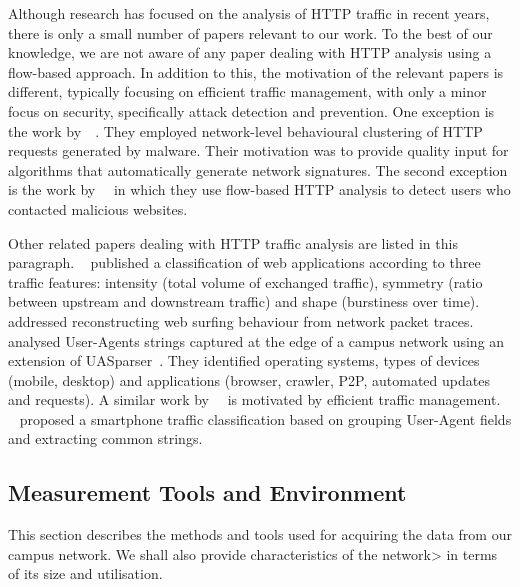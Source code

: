 Although research has focused on the analysis of HTTP traffic in recent years, there is only a small number of papers relevant to our work. To the best of our knowledge, we are not aware of any paper dealing with HTTP analysis using a flow-based approach. In addition to this, the motivation of the relevant papers is different, typically focusing on efficient traffic management, with only a minor focus on security, specifically attack detection and prevention. One exception is the work by~\citeauthor{Perdisci-2010-Behavioral}~\cite{Perdisci-2010-Behavioral}. They employed network-level behavioural clustering of HTTP requests generated by malware. Their motivation was to provide quality input for algorithms that automatically generate network signatures. The second exception is the work by~\citeauthor{Husak-2014-PhiGARo}~\cite{Husak-2014-PhiGARo} in which they use flow-based HTTP analysis to detect users who contacted malicious websites.

Other related papers dealing with HTTP traffic analysis are listed in this paragraph. \citeauthor{Augustin-2011-Traffic}~\cite{Augustin-2011-Traffic} published a classification of web applications according to three traffic features: intensity (total volume of exchanged traffic), symmetry (ratio between upstream and downstream traffic) and shape (burstiness over time). \citeauthor{Xie-2013-ReSurf}~\cite{Xie-2013-ReSurf} addressed reconstructing web surfing behaviour from network packet traces. \citeauthor{Xu-2014-Toward}~\cite{Xu-2014-Toward} analysed User-Agents strings captured at the edge of a campus network using an extension of UASparser~\cite{Mallat-2017-UASparser}. They identified operating systems, types of devices (mobile, desktop) and applications (browser, crawler, P2P, automated updates and requests). A similar work by~\citeauthor{Jin-2012-Integrated}~\cite{Jin-2012-Integrated} is motivated by efficient traffic management. \citeauthor{Hur-2012-Towards}~\cite{Hur-2012-Towards} proposed a smartphone traffic classification based on grouping User-Agent fields and extracting common strings.

\subsection{Measurement Tools and Environment}\label{subsec:httpsecurity-measurement}

This section describes the methods and tools used for acquiring the data from our campus network. We shall also provide characteristics of the network> in terms of its size and utilisation.

